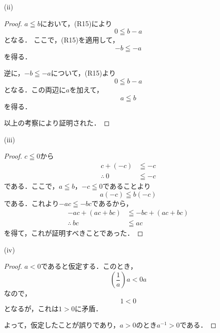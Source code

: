 \documentclass[uplatex,dvipdfmx,a4paper,10pt,fleqn]{jsarticle}
\begin{document}
    \begin{itembox}[c]{(ii)}
        \begin{proof}
            $a \leqq b$において，(R15)により
            \[
                0 \leqq b-a
            \]
            となる．
            ここで，(R15)を適用して，
            \[
                -b \leqq -a
            \]
            を得る．

            逆に，$-b\leqq -a$について，(R15)より
            \[
                0 \leqq b -a
            \]
            となる．この両辺に$a$を加えて，
            \[
                a \leqq b 
            \]
            を得る．

            以上の考察により証明された．
        \end{proof}
        \end{itembox}

    \newpage 

    \begin{itembox}[c]{(iii)}
        \begin{proof}
            $c \leqq 0$から
            \begin{align*} 
                 c+(-c) &\leqq -c \\
                \therefore ~ 0 &\leqq -c 
            \end{align*} 
            である．ここで，$a \leqq b$，$-c \leqq 0$であることより
            \[
                a(-c) \leqq b (-c)
            \]
            である．これより$ -ac \leqq -bc$であるから，
            \begin{align*} 
                -ac + (ac+bc) &\leqq -bc +(ac+bc) \\
                \therefore ~ bc &\leqq ac 
            \end{align*} 
            を得て，これが証明すべきことであった．
        \end{proof}
    \end{itembox}

    \begin{itembox}[c]{(iv)}
        \begin{proof}
            $a<0$であると仮定する．このとき，
            \[
               \left ( \frac{1}{a} \right) a < 0a
            \]
            なので，
            \[
                1<0
            \]
            となるが，これは$1>0$に矛盾．

            よって，仮定したことが誤りであり，$a>0$のとき$a^{-1} >0$である．
            \end{proof}
        \end{itembox}
\end{document}
